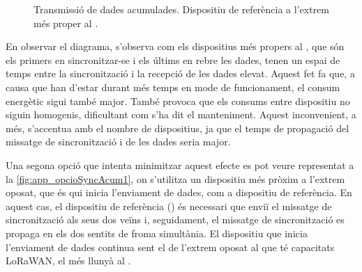\documentclass{tfgitic}[2024/07/01]
\begin{document}
{\begin{figure}[ht]
{\begin{tabular}{!{\vrule width \heavyrulewidth}c!{\vrule width \heavyrulewidth}ccccccccccccc!{\vrule width \heavyrulewidth}}
\toprule
\end{tabular}
}
\caption{Transmissió de dades acumulades. Dispositiu de referència a l'extrem més proper al .}
\label{fig:app_opcioSyncAcum1}
\end{figure}



En observar el diagrama, s'observa com els dispositius més propers al , que són els primers en sincronitzar-se i els últims en rebre les dades, tenen un espai de temps entre la sincronització i la recepció de les dades elevat. Aquest fet fa que, a causa que han d'estar durant més temps en mode de funcionament, el consum energètic sigui també major. També provoca que els consums entre dispositiu no siguin homogenis, dificultant com s'ha dit el manteniment. Aquest inconvenient, a més, s'accentua amb el nombre de dispositius, ja que el temps de propagació del missatge de sincronització i de les dades seria major. 

Una segona opció que intenta minimitzar aquest efecte es pot veure representat a la \autoref{fig:app_opcioSyncAcum1}, on s'utilitza un dispositiu més pròxim a l'extrem oposat, que és qui inicia l'enviament de dades, com a dispositiu de referència. En aquest cas, el dispositiu de referència () és necessari que enviï el missatge de sincronització als seus dos veïns i, seguidament, el missatge de sincronització es propaga en els dos sentits de froma simultània. El dispositiu que inicia l'enviament de dades continua sent el de l'extrem oposat al que té capacitats LoRaWAN, el més llunyà al .

\begin{figure}[ht]
    \centering
\setlength{\extrarowheight}{0pt}
\addtolength{\extrarowheight}{\aboverulesep}
\addtolength{\extrarowheight}{\belowrulesep}
\setlength{\aboverulesep}{0pt}
\setlength{\belowrulesep}{0pt}
\end{figure}}
\end{document}
